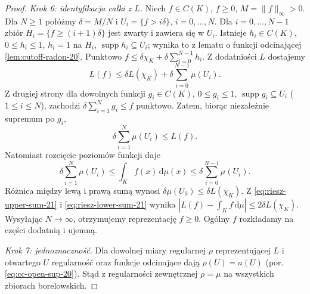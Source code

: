 \begin{proof}
\emph{Krok 6: identyfikacja całki z $L$.}
Niech $f\in C(K)$, $f\ge0$, $M=\|f\|_\infty>0$.
Dla $N\ge1$ połóżmy $\delta=M/N$ i
$U_i=\{f>i\delta\}$, $i=0,\ldots,N$.
Dla $i=0,\ldots,N-1$ zbiór
$H_i=\{f\ge(i+1)\delta\}$ jest zwarty i zawiera się
w $U_i$. Istnieje $h_i\in C(K)$, $0\le h_i\le1$,
$h_i=1$ na $H_i$, $\operatorname{supp}h_i\subseteq U_i$;
wynika to z lematu o funkcji odcinającej
\ref{lem:cutoff-radon-20}. Punktowo
$f\le\delta\chi_K+\delta\sum_{i=0}^{N-1}h_i$.
Z dodatniości $L$ dostajemy
\begin{equation}\label{eq:riesz-upper-sum-21}
 L(f)\le\delta L(\chi_K)+
           \delta\sum_{i=0}^{N-1}\mu(U_i).
\end{equation}
Z drugiej strony dla dowolnych funkcji
$g_i\in C(K)$, $0\le g_i\le1$,
$\operatorname{supp}g_i\subseteq U_i$ ($1\le i\le N$),
zachodzi $\delta\sum_{i=1}^{N}g_i\le f$ punktowo.
Zatem, biorąc niezależnie supremum po $g_i$,
\begin{equation}\label{eq:riesz-lower-sum-21}
 \delta\sum_{i=1}^{N}\mu(U_i)\le L(f).
\end{equation}
Natomiast rozcięcie poziomów funkcji daje
\[
 \delta\sum_{i=1}^{N}\mu(U_i)
 \le\int_Kf(x)\,\mathrm d\mu(x)
 \le\delta\sum_{i=0}^{N-1}\mu(U_i).
\]
Różnica między lewą i prawą sumą wynosi
$\delta\mu(U_0)\le\delta L(\chi_K)$.
Z \eqref{eq:riesz-upper-sum-21} i
\eqref{eq:riesz-lower-sum-21} wynika
$|L(f)-\int_K f\,\mathrm d\mu|\le2\delta L(\chi_K)$.
Wysyłając $N\to\infty$, otrzymujemy reprezentację
$f\ge0$. Ogólny $f$ rozkładamy na części dodatnią
i ujemną.

\emph{Krok 7: jednoznaczność.}
Dla dowolnej miary regularnej $\rho$ reprezentującej $L$
i otwartego $U$ regularność oraz funkcje odcinające
dają $\rho(U)=a(U)$ (por.
\eqref{eq:cc-open-sup-20}). Stąd z regularności
zewnętrznej $\rho=\mu$ na wszystkich zbiorach
borelowskich.
\end{proof}

